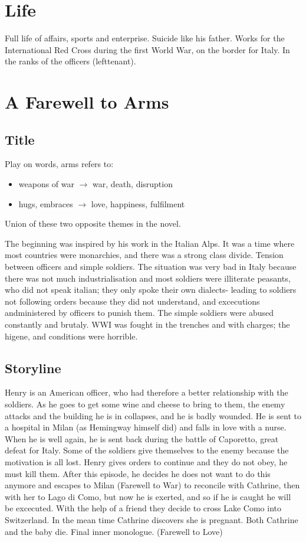 \documentclass{article}
\title{\jobname}
\author{Eugenio Animali}
\begin{document}
\maketitle
\section{Life}
Full life of affairs, sports and enterprise. Suicide like his father.
Works for the International Red Cross during the first World War, on the border for Italy. In the ranks of the officers (lefttenant).
\section{A Farewell to Arms}
\subsection{Title}
Play on words, arms refers to:
\begin{itemize}
    \item
    weapons of war $\to$ war, death, disruption
    \item
    hugs, embraces $\to$ love, happiness, fulfilment
\end{itemize}
Union of these two opposite themes in the novel.

The beginning was inspired by his work in the Italian Alps. It was a time where most countries were monarchies, and there was a strong class divide. Tension between officers and simple soldiers. The situation was very bad in Italy because there was not much industrialisation and most soldiers were illiterate peasants, who did not speak italian; they only spoke their own dialects- leading to soldiers not following orders because they did not understand, and excecutions andministered by officers to punish them. The simple soldiers were abused constantly and brutaly. WWI was fought in the trenches and with charges; the higene, and conditions were horrible.
\subsection{Storyline}
Henry is an American officer, who had therefore a better relationship with the soldiers. As he goes to get some wine and cheese to bring to them, the enemy attacks and the building he is in collapses, and he is badly wounded. He is sent to a hospital in Milan (as Hemingway himself did) and falls in love with a nurse. When he is well again, he is sent back during the battle of Caporetto, great defeat for Italy. Some of the soldiers give themselves to the enemy because the motivation is all lost. Henry gives orders to continue and they do not obey, he must kill them. After this episode, he decides he does not want to do this anymore and escapes to Milan (Farewell to War) to reconcile with Cathrine, then with her to Lago di Como, but now he is exerted, and so if he is caught he will be excecuted. With the help of a friend they decide to cross Lake Como into Switzerland. In the mean time Cathrine discovers she is pregnant. Both Cathrine and the baby die. Final inner monologue. (Farewell to Love)
\end{document}
